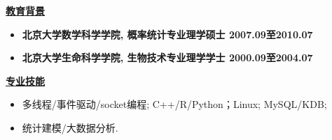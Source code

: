 \documentclass[a4paper]{article}
\begin{document}
\vspace {2.5ex}
\setlength \parindent{2em}
\textbf { \uline{教育背景}}
\vspace{0ex}

\begin{itemize}
  \setlength{\topsep}{5ex}
  \setlength{\itemsep}{2ex}
  \setlength{\parsep}{5ex}
  \setlength{\parskip}{.5ex}
	\item  {\bfseries {} {北京大学数学科学学院, 概率统计专业理学硕士 \hfill 2007.09至2010.07}}
	\item  {\bfseries {} {北京大学生命科学学院, 生物技术专业理学学士 \hfill 2000.09至2004.07}}
\end{itemize}

\vspace{2.5ex}
\textbf { \uline{专业技能}}
\vspace{0.001ex}

\begin {itemize}
	\item {} 多线程/事件驱动/socket编程; C++/R/Python；Linux; MySQL/KDB;
	\item {} 统计建模/大数据分析.
\end{itemize}
\end{document}
